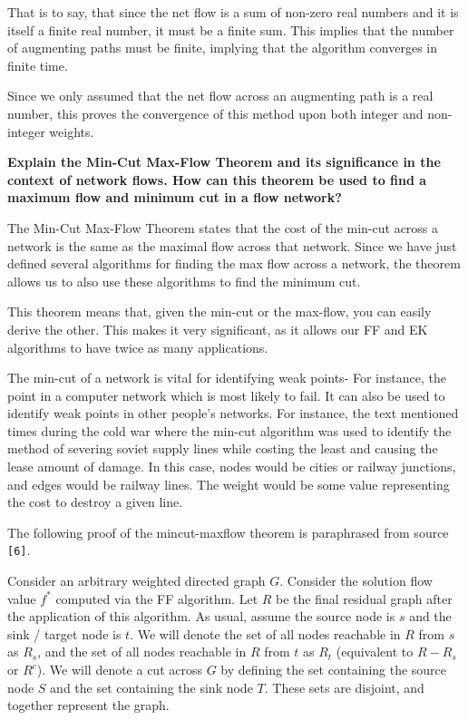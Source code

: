 \documentclass[12pt]{amsart}
\begin{document}
    That is to say, that since the net flow is a sum of non-zero
    real numbers and it is itself a finite real number, it must
    be a finite sum. This implies that the number of augmenting
    paths must be finite, implying that the algorithm converges
    in finite time.

    Since we only assumed that the net flow across an augmenting
    path is a real number, this proves the convergence of this
    method upon both integer and non-integer weights.

    \textbf{Explain the Min-Cut Max-Flow Theorem and its
    significance in the context of network flows. How can this
    theorem be used to find a maximum flow and minimum cut in a
    flow network?}

    The Min-Cut Max-Flow Theorem states that the cost of the
    min-cut across a network is the same as the maximal flow
    across that network. Since we have just defined several
    algorithms for finding the max flow across a network, the
    theorem allows us to also use these algorithms to find the
    minimum cut.

    This theorem means that, given the min-cut or the max-flow,
    you can easily derive the other. This makes it very
    significant, as it allows our FF and EK algorithms to have
    twice as many applications.

    The min-cut of a network is vital for identifying weak
    points- For instance, the point in a computer network which
    is most likely to fail. It can also be used to identify weak
    points in other people's networks. For instance, the text
    mentioned times during the cold war where the min-cut
    algorithm was used to identify the method of severing soviet
    supply lines while costing the least and causing the lease
    amount of damage. In this case, nodes would be cities or
    railway junctions, and edges would be railway lines. The
    weight would be some value representing the cost to destroy
    a given line.

    The following proof of the mincut-maxflow theorem is
    paraphrased from source \verb|[6]|.

    Consider an arbitrary weighted directed graph $G$. Consider
    the solution flow value $f^*$ computed via the FF algorithm.
    Let $R$ be the final residual graph after the application of
    this algorithm. As usual, assume the source node is $s$ and
    the sink / target node is $t$. We will denote the set of all
    nodes reachable in $R$ from $s$ as $R_s$, and the set of all
    nodes reachable in $R$ from $t$ as $R_t$ (equivalent to
    $R - R_s$ or $R^c$). We will denote a cut across $G$ by
    defining the set containing the source node $S$ and the set
    containing the sink node $T$. These sets are disjoint, and
    together represent the graph.
\end{document}
